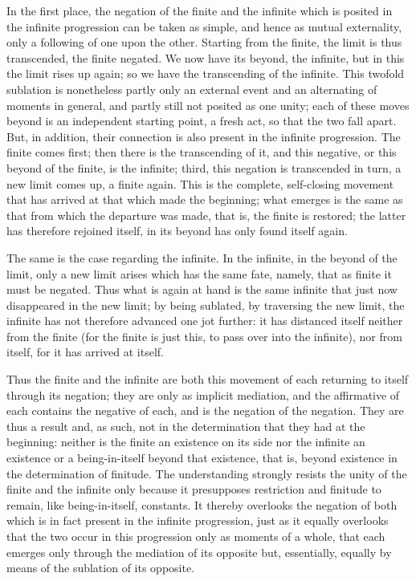 In the first place,
the negation of the finite and the infinite
which is posited in the infinite progression
can be taken as simple,
and hence as mutual externality,
only a following of one upon the other.
Starting from the finite,
the limit is thus transcended, the finite negated.
We now have its beyond, the infinite,
but in this the limit rises up again;
so we have the transcending of the infinite.
This twofold sublation is nonetheless
partly only an external event
and an alternating of moments in general,
and partly still not posited as one unity;
each of these moves beyond is an independent starting point,
a fresh act, so that the two fall apart.
But, in addition, their connection is
also present in the infinite progression.
The finite comes first;
then there is the transcending of it,
and this negative, or this beyond of the finite,
is the infinite;
third, this negation is transcended in turn,
a new limit comes up, a finite again.
This is the complete, self-closing movement
that has arrived at that which made the beginning;
what emerges is the same as that
from which the departure was made,
that is, the finite is restored;
the latter has therefore rejoined itself,
in its beyond has only found itself again.

The same is the case regarding the infinite.
In the infinite, in the beyond of the limit,
only a new limit arises which has the same fate, namely,
that as finite it must be negated.
Thus what is again at hand is the same infinite
that just now disappeared in the new limit;
by being sublated, by traversing the new limit,
the infinite has not therefore advanced one jot further:
it has distanced itself neither from the finite
(for the finite is just this,
to pass over into the infinite),
nor from itself, for it has arrived at itself.

Thus the finite and the infinite are both
this movement of each returning to itself through its negation;
they are only as implicit mediation,
and the affirmative of each contains the negative of each,
and is the negation of the negation.
They are thus a result
and, as such, not in the determination
that they had at the beginning:
neither is the finite an existence on its side
nor the infinite an existence
or a being-in-itself beyond that existence,
that is, beyond existence in the determination of finitude.
The understanding strongly resists the unity of the finite and the infinite
only because it presupposes restriction and finitude to remain,
like being-in-itself, constants.
It thereby overlooks the negation of both
which is in fact present in the infinite progression,
just as it equally overlooks that the two occur in this
progression only as moments of a whole,
that each emerges only through the mediation of its opposite
but, essentially, equally by means of the sublation of its opposite.

